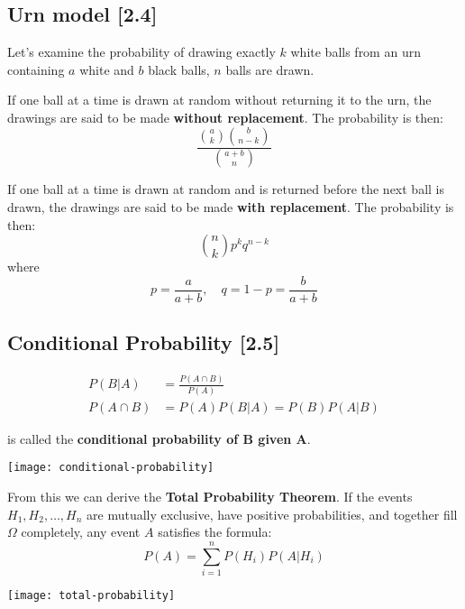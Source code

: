 \documentclass[a4paper,9pt]{extarticle}
\begin{document}
\begin{multicols*}{2}
\subsection{Urn model [2.4]}
Let's examine the probability of drawing exactly $k$ white balls from an urn containing $a$ white and $b$ black balls, $n$ balls are drawn.

If one ball at a time is drawn at random without returning it to the urn, the drawings are said to be made \textbf{without replacement}. The probability is then:
\begin{equation}
    \frac{\binom{a}{k} \binom{b}{n-k}}{\binom{a + b}{n}}
\end{equation}

If one ball at a time is drawn at random and is returned before the next ball is drawn, the drawings are said to be made \textbf{with replacement}. The probability is then:
\begin{equation}
    \binom{n}{k} p^k q^{n-k}
\end{equation}
where
\begin{equation}
    p = \frac{a}{a+b}, \quad q = 1 - p = \frac{b}{a+b}
\end{equation}

\subsection{Conditional Probability [2.5]}
\begin{equation}
    \begin{split}
        P(B|A) & = \frac{P(A \cap B)}{P(A)} \\
        P(A \cap B) & = P(A) P(B|A) = P(B) P(A|B)
    \end{split}
\end{equation}

is called the \textbf{conditional probability of B given A}.
{\centering \texttt{[image: conditional-probability]} \par}

From this we can derive the \textbf{Total Probability Theorem}. If the events $H_1, H_2, \dots , H_n$ are mutually exclusive, have positive probabilities, and together fill $\Omega$ completely, any event $A$ satisfies the formula:
\begin{equation}
    P(A) = \sum_{i=1}^n P(H_i) P(A|H_i)
\end{equation}
{\centering \texttt{[image: total-probability]} \par}


\end{multicols*}
\end{document}
